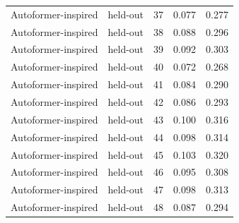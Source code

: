 \begin{tabular}{llrrr}
Autoformer-inspired & held-out & 37 & 0.077 & 0.277 \\
Autoformer-inspired & held-out & 38 & 0.088 & 0.296 \\
Autoformer-inspired & held-out & 39 & 0.092 & 0.303 \\
Autoformer-inspired & held-out & 40 & 0.072 & 0.268 \\
Autoformer-inspired & held-out & 41 & 0.084 & 0.290 \\
Autoformer-inspired & held-out & 42 & 0.086 & 0.293 \\
Autoformer-inspired & held-out & 43 & 0.100 & 0.316 \\
Autoformer-inspired & held-out & 44 & 0.098 & 0.314 \\
Autoformer-inspired & held-out & 45 & 0.103 & 0.320 \\
Autoformer-inspired & held-out & 46 & 0.095 & 0.308 \\
Autoformer-inspired & held-out & 47 & 0.098 & 0.313 \\
Autoformer-inspired & held-out & 48 & 0.087 & 0.294 \\
\bottomrule
\end{tabular}
